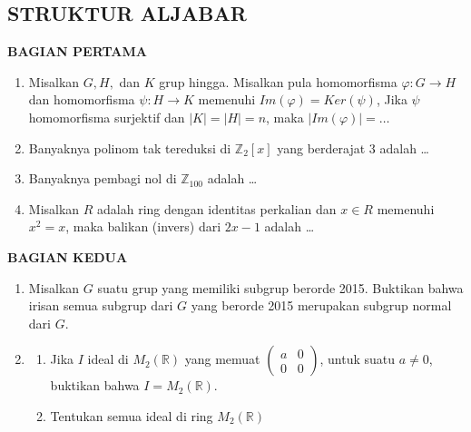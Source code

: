 \documentclass[12pt,twoside]{article}
\begin{document}
\subsection{STRUKTUR ALJABAR}
\textbf{BAGIAN PERTAMA}
\begin{enumerate}
	\item Misalkan $G,H,$ dan $K$ grup hingga. Misalkan pula homomorfisma $\varphi : G \to H$ dan homomorfisma $\psi : H \to K$ memenuhi $Im(\varphi) = Ker(\psi)$, Jika $\psi$ homomorfisma surjektif dan $|K|=|H|=n$, maka $|Im(\varphi)|=\dots$

	\item Banyaknya polinom tak tereduksi di $\mathbb{Z}_2[x]$ yang berderajat 3 adalah \dots

	\item Banyaknya pembagi nol di $\mathbb{Z}_{100}$ adalah \dots

	\item Misalkan $R$ adalah ring dengan identitas perkalian dan $x \in R$ memenuhi $x^2 = x$, maka balikan (invers) dari $2x-1$ adalah \dots
\end{enumerate}

\newpage \textbf{BAGIAN KEDUA}
\begin{enumerate}
	\item Misalkan $G$ suatu grup yang memiliki subgrup berorde 2015. Buktikan bahwa irisan semua subgrup dari $G$ yang berorde 2015 merupakan subgrup normal dari $G$.

	\item \begin{enumerate}
		      \item Jika $I$ ideal di $M_2(\mathbb{R})$ yang memuat $\left( \begin{array}{cc}
					            a & 0 \\0&0
				            \end{array} \right)$, untuk suatu $a \neq 0$, buktikan bahwa $I = M_2(\mathbb{R})$.
		      \item Tentukan semua ideal di ring $M_2(\mathbb{R})$
	      \end{enumerate}
\end{enumerate}
\pagebreak
\end{document}
